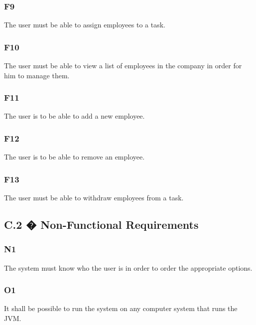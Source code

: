 \documentclass[12pt]{article}
\begin{document}
\subsubsection{F9}
{
The user must be able to assign employees to a task.
}
\subsubsection{F10}
{
The user must be able to view a list of employees in the company in order for him to manage them.
}
\subsubsection{F11}
{
The user is to be able to add a new employee.
}
\subsubsection{F12}
{
The user is to be able to remove an employee.
}
\subsubsection{F13}                                                                         
{
The user must be able to withdraw employees from a task.
}
\subsection{C.2 � Non-Functional Requirements}
\subsubsection{N1}
{
The system must know who the user is in order to order the appropriate options.
}
\subsubsection{O1}
{
It shall be possible to run the system on any computer system that runs the JVM.
}
\end{document}
